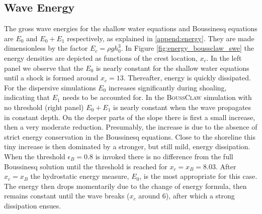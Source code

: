 \documentclass[review]{elsarticle}
\newcommand{\BoussClaw}{\textsc{BoussClaw} }
\begin{document}
\subsection{Wave Energy}
\label{sec:wave_energy}
The gross wave energies  
for the shallow water equations and Boussinesq equations
are $E_0$ and $E_0+E_1$  respectively, as explained in \ref{append:energy}.
They are made dimensionless by the factor $E_c=\rho g h_0^3$. 
In Figure \ref{fig:energy_boussclaw_swe} the energy densities are depicted as 
functions of the crest location, $x_c$. 
In the left panel 
we observe that the $E_0$ is nearly constant 
for the shallow water equations until a shock is formed around $x_c=13$.
Thereafter, energy is quickly dissipated. For the dispersive simulations $E_0$
increases significantly during shoaling, indicating that $E_1$ needs to be accounted for.
In  the \BoussClaw simulation with no threshold (right panel) 
$E_0+E_1$ is nearly constant when the wave propagates in constant depth. 
On the deeper parts of the slope there is first a small increase, then a
very moderate reduction. Presumably, the increase is  due to the absence of strict energy  conservation in the Boussinesq equations. 
Close to the shoreline this tiny increase is then dominated by a stronger, but still mild, energy dissipation.
When the threshold $\epsilon_B=0.8$ is invoked there is no difference from the full Boussinesq solution until the threshold is reached for  $x_c=x_B=8.03$. 
After  $x_c=x_B$  
the hydrostatic energy measure, $E_0$, is the most appropriate for this case.
The energy then drops momentarily due to the change of energy formula, then remains constant until the wave breaks ($x_c$ around 6), after which a strong dissipation ensues.
\end{document}
